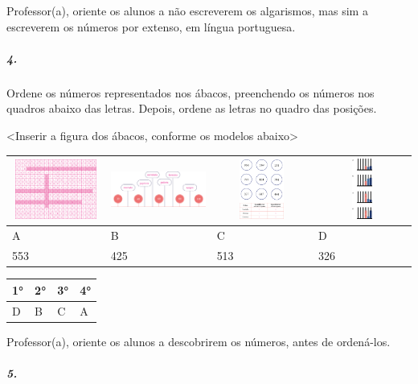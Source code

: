 Professor(a), oriente os alunos a não escreverem os algarismos, mas sim
a escreverem os números por extenso, em língua portuguesa.

\subparagraph{4. }\label{section-3}

Ordene os números representados nos ábacos, preenchendo os
números nos quadros abaixo das letras. Depois, ordene as letras no
quadro das posições.

\textless{}Inserir a figura dos ábacos, conforme os modelos
abaixo\textgreater{}

\begin{longtable}[]{@{}llll@{}}
\toprule
\includegraphics[width=1.24938in,height=0.76667in]{media/image13.png} &
\includegraphics[width=1.35417in,height=0.78502in]{media/image14.png} &
\includegraphics[width=1.29167in,height=0.76677in]{media/image15.png} &
\includegraphics[width=1.25000in,height=0.78248in]{media/image16.png}\tabularnewline
\midrule
\endhead
A & B & C & D\tabularnewline
553 & 425 & 513 & 326\tabularnewline
\bottomrule
\end{longtable}

\begin{longtable}[]{@{}llll@{}}
\toprule
\textbf{1°} & \textbf{2°} & \textbf{3°} & \textbf{4°}\tabularnewline
\midrule
\endhead
D & B & C & A\tabularnewline
\bottomrule
\end{longtable}

Professor(a), oriente os alunos a descobrirem os números, antes de ordená-los.

\subparagraph{5. }\label{section-4}

